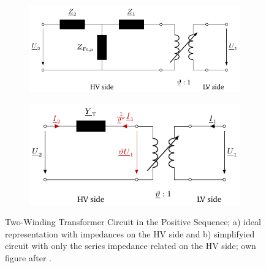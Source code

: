 \begin{figure}%
    \centering
    \begin{subfigure}[c]{.53\textwidth}
        \centering
        \includegraphics[width=\linewidth]{tikz_graphics/images/transformer_complete.pdf}
    \end{subfigure}
    \begin{subfigure}[c]{.46\textwidth}
        \centering
        \includegraphics[width=\linewidth]{tikz_graphics/images/transformer_reduced.pdf}
    \end{subfigure}
    \caption[Two-Winding Transformer Circuit in the Positive Sequence]{Two-Winding Transformer Circuit in the Positive Sequence; a) ideal representation with impedances on the \acs{HV} side and b) simplifyied circuit with only the series impedance related on the \acs{HV} side; own figure after \autocite{machowski_2020,kundur_2022,milano_2010}.}
    \label{fig:trafo-model}
\end{figure}

